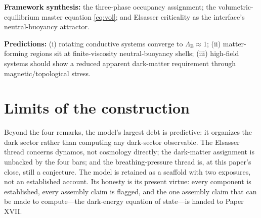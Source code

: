 \documentclass[11pt]{article}
\theoremstyle{remark}
\newcommand{\Els}{\Lambda_{\mathrm{E}}}
\begin{document}
\textbf{Framework synthesis:} the three-phase occupancy assignment; the volumetric-equilibrium master equation \eqref{eq:vol}; and Elsasser criticality as the interface's neutral-buoyancy attractor.

\textbf{Predictions:} (i) rotating conductive systems converge to $\Els \approx 1$; (ii) matter-forming regions sit at finite-viscosity neutral-buoyancy shells; (iii) high-field systems should show a reduced apparent dark-matter requirement through magnetic/topological stress.
\section{Limits of the construction}
Beyond the four remarks, the model's largest debt is predictive: it organizes the dark sector rather than computing any dark-sector observable. The Elsasser thread concerns dynamos, not cosmology directly; the dark-matter assignment is unbacked by the four bars; and the breathing-pressure thread is, at this paper's close, still a conjecture. The model is retained as a scaffold with two exposures, not an established account. Its honesty is its present virtue: every component is established, every assembly claim is flagged, and the one assembly claim that can be made to compute---the dark-energy equation of state---is handed to Paper XVII.
\end{document}
